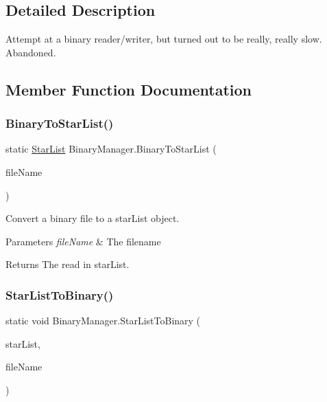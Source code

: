 \subsection{Detailed Description}
Attempt at a binary reader/writer, but turned out to be really, really slow. Abandoned. 



\subsection{Member Function Documentation}
\mbox{\label{class_binary_manager_aa2640924cb02371025d1741cdfafeacf}} 
\subsubsection{\texorpdfstring{BinaryToStarList()}{BinaryToStarList()}}
{\footnotesize\ttfamily static \mbox{\hyperlink{class_star_list}{Star\+List}} Binary\+Manager.\+Binary\+To\+Star\+List (\begin{DoxyParamCaption}\item[{string}]{file\+Name }\end{DoxyParamCaption})\hspace{0.3cm}{\ttfamily [static]}}



Convert a binary file to a star\+List object. 


\begin{DoxyParams}{Parameters}
{\em file\+Name} & The filename\\
\hline
\end{DoxyParams}
\begin{DoxyReturn}{Returns}
The read in star\+List.
\end{DoxyReturn}
\mbox{\label{class_binary_manager_a5ed7a73e8b658af239df501ef664cf1d}} 
\subsubsection{\texorpdfstring{StarListToBinary()}{StarListToBinary()}}
{\footnotesize\ttfamily static void Binary\+Manager.\+Star\+List\+To\+Binary (\begin{DoxyParamCaption}\item[{\mbox{\hyperlink{class_star_list}{Star\+List}}}]{star\+List,  }\item[{string}]{file\+Name }\end{DoxyParamCaption})\hspace{0.3cm}{\ttfamily [static]}}



